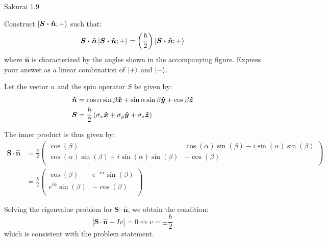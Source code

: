 \documentclass{article}
\begin{document}
\newpage
\begin{section}{Sakurai 1.9}
	\newcommand{\sdotn}{\boldsymbol{S \cdot \hat{n}}}
	\newcommand{\sdotnplus}{\ket{\sdotn; +}}

	Construct $\sdotnplus$ such that:
	\begin{align*}
		\sdotn \sdotnplus = \pbracket{\frac{\hbar}{2}} \sdotnplus
	\end{align*}
	where $\boldsymbol{\hat{n}}$ is characterized by the angles shown in the accompanying figure. Express your answer as a linear combination of $\ket{+}$ and $\ket{-}$.

	\begin{tcolorbox}[breakable]
		Let the vector $n$ and the spin operator $S$ be given by:
		\begin{align*}
			\boldsymbol{\hat{n}} & = \cos{\alpha}\sin{\beta} \boldsymbol{\hat{x}} + \sin{\alpha}\sin{\beta} \boldsymbol{\hat{y}} + \cos{\beta} \boldsymbol{\hat{z}} \\
			\boldsymbol{S}       & = \frac{\hbar}{2} \left(\sigma_x \boldsymbol{\hat{x}} + \sigma_y \boldsymbol{\hat{y}} + \sigma_z \boldsymbol{\hat{z}}\right)
		\end{align*}

		The inner product is thus given by:
		\begin{align*}
			\sdotn & = \frac{\hbar}{2}
			\left(
			\begin{array}{cc}
					\cos (\beta )                                               & \cos (\alpha ) \sin (\beta )-i \sin (\alpha ) \sin (\beta ) \\
					\cos (\alpha ) \sin (\beta )+i \sin (\alpha ) \sin (\beta ) & -\cos (\beta )                                              \\
				\end{array}
			\right)                    \\
			       & = \frac{\hbar}{2}
			\left(
			\begin{array}{cc}
					\cos (\beta )              & e^{-i \alpha} \sin (\beta ) \\
					e^{i \alpha} \sin (\beta ) & -\cos (\beta )              \\
				\end{array}
			\right)
		\end{align*}

		Solving the eigenvalue problem for $\sdotn$, we obtain the condition:
		\begin{equation*}
			|\sdotn - Iv| = 0 \iff v = \pm \frac{\hbar}{2}
		\end{equation*}
		which is consistent with the problem statement.


\end{tcolorbox}
\end{section}
\end{document}
